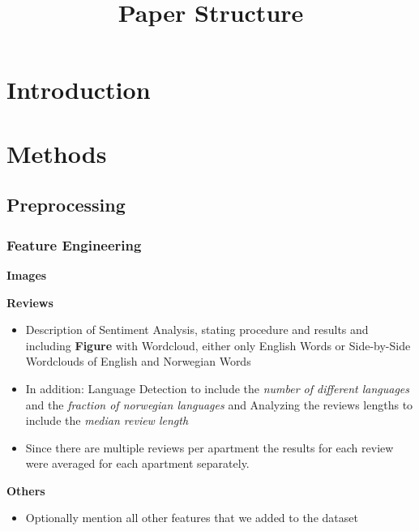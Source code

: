 \documentclass[12pt, letterpaper]{article}
\title{Paper Structure}
\author{}
\date{}
\begin{document}
\maketitle
\tableofcontents
\setcounter{tocdepth}{3}

\section{Introduction}

\section{Methods}

\subsection{Preprocessing}

\subsubsection{Feature Engineering}

\textbf{Images}

\textbf{Reviews}
\begin{itemize}
    \item Description of Sentiment Analysis, stating procedure and results and including \textbf{Figure} with Wordcloud, either only English Words or Side-by-Side Wordclouds of English and Norwegian Words
    \item In addition: Language Detection to include the \emph{number of different languages} and the \emph{fraction of norwegian languages} and Analyzing the reviews lengths to include the \emph{median review length}
    \item Since there are multiple reviews per apartment the results for each review were averaged for each apartment separately.
\end{itemize}

\textbf{Others}
\begin{itemize}
    \item Optionally mention all other features that we added to the dataset
\end{itemize}
\end{document}
